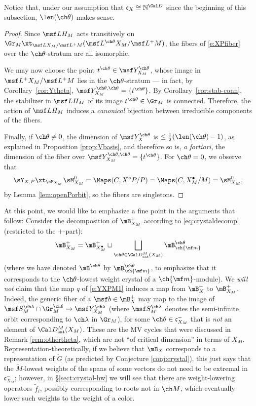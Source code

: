 Notice that, under our assumption that $\mathfrak c_X \cong
\mathbb N^{\Cal D}$ since the beginning of this subsection, $\len(\ch\theta)$ makes sense.
\begin{proof}
Since $\msf LH_M$ acts transitively on
$\Gr_M \xt_{\msf L X_M / \msf L^+M} (\msf L^{\ch\theta} X_M / \msf L^+M)$,
the fibers of \eqref{e:XPfiber} over the $\ch\theta$-stratum are all isomorphic.

We may now choose the point $t^{\ch\theta}\in \msf Y_{X_M}^{\ch\theta}$, whose image in $\msf L^+ X_M / \msf L^+M$ lies in the $\ch\theta$-stratum --- in fact, by Corollary~\ref{cor:Ytheta}, $\msf Y_{X_M}^{\ch\theta,\ch\theta} = \{ t^{\ch\theta}\}$. By Corollary~\ref{cor:stab-conn}, the stabilizer in $\msf L H_M$ of its image
$t^{\ch\theta}\in \Gr_M$
is connected. Therefore, the action of $\msf L H_M$ induces a \emph{canonical} bijection between irreducible components of the fibers.

Finally, if $\ch\theta\ne 0$, the dimension of $\msf Y^{\ch\theta}_X$ is $\le \frac 1 2 (\len(\ch\theta)-1)$, as explained in Proposition \ref{prop:Vbasis}, and therefore so is, \emph{a fortiori}, the dimension of the fiber over $\msf Y_{X_M}^{\ch\theta,\ch\theta} = \{ t^{\ch\theta}\}$. For $\ch\theta =0$, we observe that
\[ \sY_{X,P} \xt_{\sM_{X_M}}     \sM_{X_M}^0 = \Maps(C, X^\circ P/P) = \Maps(C, X_M^\bullet /M) =  \sM_{X_M}^0,\]
by Lemma \ref{lem:openPorbit}, so the fibers are singletons.
\end{proof}

\begin{rem}
\notready
At this point, we would like to emphasize a fine point in the arguments that follow: Consider the decomposition of $\mB_{X_M}^+$ according to \eqref{eq:crystaldecomp} (restricted to the $+$-part):
\[\mB_{X_M}^+ =  \mB_{X_M^\bullet}^+ \sqcup \bigsqcup_{\ch\theta \in \Cal D^M_{\mathrm{sat}}(X_M)} \mB^{\ch\theta}_{\ch{\mf m}}\]
(where we have denoted $\mB^{\ch\theta}$ by $\mB^{\ch\theta}_{\ch{\mf m}}$, to emphasize that it corresponds to the $\ch\theta$-lowest weight crystal of a $\ch{\mf m}$-module). We \emph{will not} claim that the map $q$ of \eqref{e:YXPM1} induces a map from $\mB_X^+$ to $\mB_{X_M}^+$. Indeed, the generic fiber of a $\msf b\in \mB_X^+$ may map to the image of $\msf S_M^{\ch\lambda} \cap \Gr_M^{\ch\theta} \to \msf Y_{X_M}^{\ch\lambda}$ (where $\msf S_M^{\ch\lambda}$ denotes the semi-infinite orbit corresponding to $\ch\lambda$ in $\Gr_M$), for some $\ch\theta \in \mathfrak c_{X_M}^-$ that is \emph{not} an element of $\Cal D^M_{\mathrm{sat}}(X_M)$. These are the MV cycles that were discussed in Remark \ref{rem:othertheta}, which are not ``of critical dimension'' in terms of $X_M$.
Representation-theoretically, if we believe that $\mB_X$ corresponds to a representation of $\check G$ (as predicted by Conjecture \ref{conj:crystal}), this just says that the $\check M$-lowest weights of the spans of some vectors do not need to be extremal in $\mathfrak c_{X_M}^-$; however, in \S \ref{sect:crystal-hw} we will see that there are weight-lowering operators $\tilde f_i$, possibly corresponding to roots not in $\ch M$, which eventually lower such weights to the weight of a color.
\end{rem}

